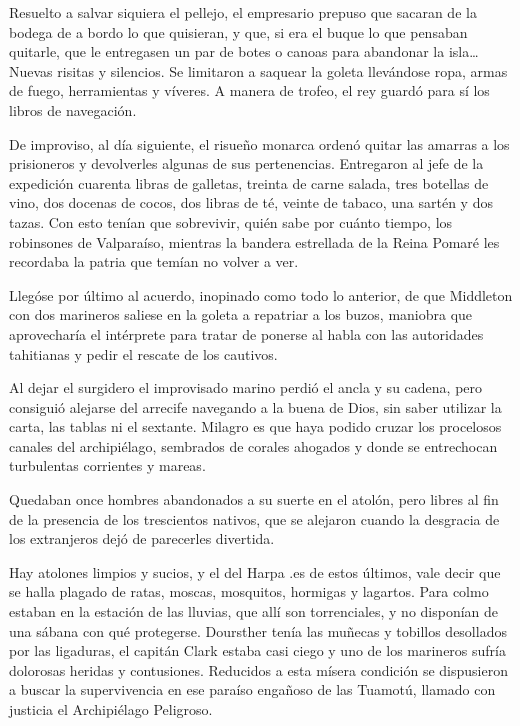 \documentclass[10pt,twoside,openright]{memoir}
\begin{document}
Resuelto a salvar siquiera el pellejo, el empresario prepuso que sacaran
de la bodega de a bordo lo que quisieran, y que, si era el buque lo que
pensaban quitarle, que le entregasen un par de botes o canoas para
abandonar la isla\ldots Nuevas risitas y silencios. Se limitaron a saquear
la goleta llevándose ropa, armas de fuego, herramientas y víveres. A
manera de trofeo, el rey guardó para sí los libros de navegación.

De improviso, al día siguiente, el risueño monarca ordenó quitar las
amarras a los prisioneros y devolverles algunas de sus pertenencias.
Entregaron al jefe de la expedición cuarenta libras de galletas, treinta
de carne salada, tres botellas de vino, dos docenas de cocos, dos libras
de té, veinte de tabaco, una sartén y
dos tazas. Con esto tenían que
sobrevivir, quién sabe por cuánto tiempo, los robinsones de Valparaíso,
mientras la bandera estrellada de la
Reina Pomaré les recordaba la patria que temían no volver a ver.

Llegóse por último al acuerdo, inopinado como todo lo anterior, de que
Middleton con dos marineros saliese en la goleta a repatriar a los
buzos, maniobra que aprovecharía el
intérprete para tratar de ponerse al habla con las autoridades
tahitianas y pedir el rescate de los cautivos.

Al dejar el surgidero el improvisado marino perdió el ancla y su cadena,
pero consiguió alejarse del arrecife navegando a la buena de Dios, sin
saber utilizar la carta, las tablas ni el sextante. Milagro es que haya
podido cruzar los procelosos canales del archipiélago, sembrados de
corales ahogados y donde se entrechocan turbulentas corrientes y mareas.

Quedaban once hombres abandonados a su suerte en el atolón, pero libres
al fin de la presencia de los trescientos nativos, que se alejaron
cuando la desgracia de los extranjeros dejó de parecerles divertida.

Hay atolones limpios y sucios, y el del Harpa .es
de estos últimos, vale decir que se
halla plagado de ratas, moscas, mosquitos, hormigas y lagartos. Para
colmo estaban en la estación de las lluvias, que allí
son torrenciales, y no disponían de
una sábana con qué protegerse. Doursther tenía las muñecas y tobillos
desollados por las ligaduras, el capitán Clark estaba casi ciego y uno
de los marineros sufría dolorosas
heridas y contusiones. Reducidos a
esta mísera condición se dispusieron a buscar la supervivencia en ese
paraíso engañoso de las Tuamotú, llamado con justicia el Archipiélago
Peligroso.
\end{document}
